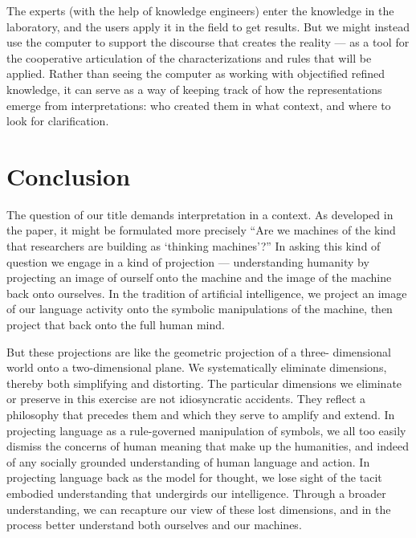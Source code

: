 \documentclass[12pt]{article}
\begin{document}
The experts (with the help of knowledge engineers) enter the knowledge in the laboratory, and the users apply it in the field to get results. But we might instead use the computer to support the discourse that creates the reality --- as a tool for the cooperative articulation of the characterizations and rules that will be applied. Rather than seeing the computer as working with objectified refined knowledge, it can serve as a way of keeping track of how the representations emerge from interpretations: who created them in what context, and where to look for clarification.

\section{Conclusion}

The question of our title demands interpretation in a context. As developed in the paper, it might be formulated more precisely ``Are we machines of the kind that researchers are building as `thinking machines'?'' In asking this kind of question we engage in a kind of projection --- understanding humanity by projecting an image of ourself onto the machine and the image of the machine back onto ourselves. In the tradition of artificial intelligence, we project an image of our language activity onto the symbolic manipulations of the machine, then project that back onto the full human mind.

But these projections are like the geometric projection of a three- dimensional world onto a two-dimensional plane. We systematically eliminate dimensions, thereby both simplifying and distorting. The particular dimensions we eliminate or preserve in this exercise are not idiosyncratic accidents. They reflect a philosophy that precedes them and which they serve to amplify and extend. In projecting language as a rule-governed manipulation of symbols, we all too easily dismiss the concerns of human meaning that make up the humanities, and indeed of any socially grounded understanding of human language and action. In projecting language back as the model for thought, we lose sight of the tacit embodied understanding that undergirds our intelligence. Through a broader understanding, we can recapture our view of these lost dimensions, and in the process better understand both ourselves and our machines.

\bigskip
\noindent

\printbibliography
\end{document}
